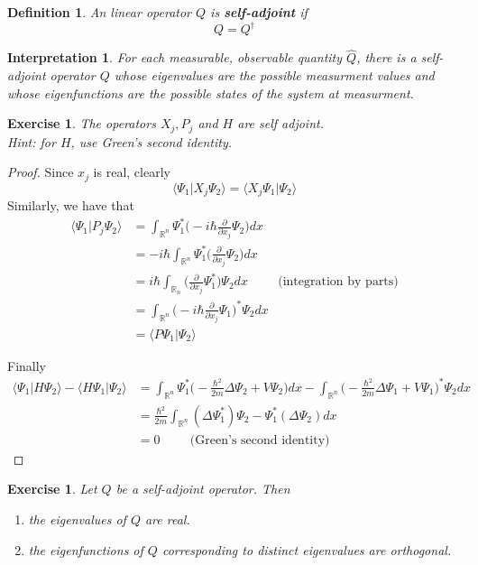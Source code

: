 \documentclass[12pt]{amsart}
\newtheorem{defn}[thm]{Definition}
\newtheorem{intp}[thm]{Interpretation}
\newtheorem{ex}[thm]{Exercise}
\renewcommand{\r}{\rangle}
\renewcommand{\l}{\langle}
\newcommand{\Del}{\Delta}
\newcommand{\R}{\mathbb{R}}
\newcommand{\p}[1]{\frac{\partial}{\partial{#1}}}
\begin{document}
\begin{defn}
An linear operator $Q$ is \textbf{self-adjoint} if $$Q = Q^{\dagger}$$
\end{defn}

\begin{intp}
For each measurable, observable quantity $\hat{Q}$, there is a self-adjoint operator $Q$ whose eigenvalues are the possible measurment values and whose eigenfunctions are the possible states of the system at measurment.
\end{intp}

\begin{ex}
The operators $X_j, P_j$ and $H$ are self adjoint. \\Hint: for $H$, use Green's second identity.
\end{ex}

\begin{proof}
Since $x_j$ is real, clearly $$\l \Psi_1 \vert X_j \Psi_2 \r = \l X_j\Psi_1 \vert \Psi_2 \r $$ Similarly, we have that 
\begin{align*}
\l \Psi_1 \vert P_j \Psi_2 \r
&=  \int_{\R^n} \Psi_1^* \bigg(-i\hbar\p{x_j} \Psi_2\bigg)dx \\
&= -i \hbar\int_{\R^n} \Psi_1^*  \bigg(\p{x_j} \Psi_2\bigg)dx\\
&= i\hbar \int_{\R_n} \bigg( \p{x_j} \Psi_1^* \bigg) \Psi_2 dx \hspace{1cm } \text{(integration by parts)}\\
&= \int_{\R^n} \bigg( -i \hbar \p{x_j} \Psi_1 \bigg)^* \Psi_2 dx\\
&= \l P \Psi_1 \vert \Psi_2 \r
\end{align*}

Finally 
\begin{align*}
\l \Psi_1 \vert H \Psi_2 \r - \l H \Psi_1 \vert  \Psi_2 \r
&= \int_{\R^n} \Psi_1^* \bigg(-\frac{\hbar^2}{2m}\Del \Psi_2 + V \Psi_2\bigg)dx - \int_{\R^n} \bigg(-\frac{\hbar^2}{2m}\Del \Psi_1 + V\Psi_1\bigg)^*  \Psi_2 dx \\
&= \frac{\hbar^2}{2m}\int_{\R^n} (\Del \Psi_1^* )\Psi_2 - \Psi_1^*(\Del \Psi_2)dx\\
&= 0 \hspace{1cm} \text{(Green's second identity)}
\end{align*}
\end{proof}

\begin{ex}
Let $Q$ be a self-adjoint operator. Then 
\begin{enumerate}
\item the eigenvalues of $Q$ are real.
\item the eigenfunctions of $Q$ corresponding to distinct eigenvalues are orthogonal.
\end{enumerate}
\end{ex}
\end{document}
